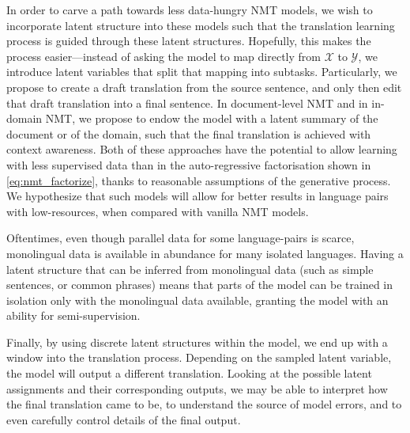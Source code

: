 In order to carve a path towards less data-hungry NMT models, we wish
to incorporate latent structure into these models such that the
translation learning process is guided through these latent
structures. Hopefully, this makes the process easier---instead of
asking the model to map directly from $\mathcal{X}$ to $\mathcal{Y}$,
we introduce latent variables that split that mapping into subtasks.
Particularly, we propose to create a draft translation from the
source sentence, and only then edit that draft translation into a
final sentence. In document-level NMT and in in-domain NMT, we
propose to endow the model with a latent summary of the document or
of the domain, such that the final translation is achieved with
context awareness. Both of these approaches have the potential to
allow learning with less supervised data than in the auto-regressive
factorisation shown in \eqref{eq:nmt_factorize}, thanks to reasonable
assumptions of the generative process. We hypothesize that such models
will allow for better results in language pairs with low-resources,
when compared with vanilla NMT models.

Oftentimes, even though parallel data for some language-pairs is
scarce, monolingual data is available in abundance for many
isolated languages. Having a latent structure that can be inferred
from monolingual data (such as simple sentences, or common phrases)
means that parts of the model can be trained in isolation
only with the monolingual data available, granting the model
with an ability for semi-supervision.

Finally, by using discrete latent structures within the model, we end
up with a window into the translation process. Depending on the
sampled latent variable, the model will output a different
translation. Looking at the possible latent assignments and their
corresponding outputs, we may be able to interpret how the final
translation came to be, to understand the source of model errors,
and to even carefully control details of the final output.

